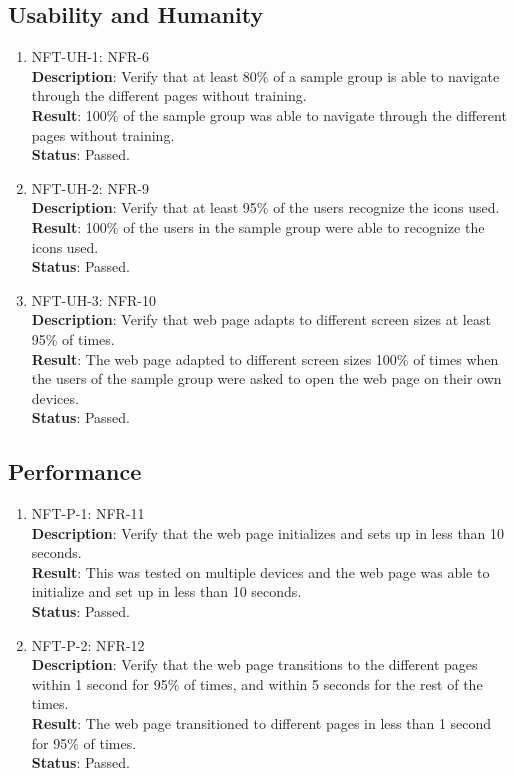 \documentclass[12pt, titlepage]{article}
\begin{document}
\subsection{Usability and Humanity}
\begin{enumerate}
    \item NFT-UH-1: NFR-6\\
    \textbf{Description}: Verify that at least 80\% of a sample group is able to navigate through the different pages without training.\\
    \textbf{Result}: 100\% of the sample group was able to navigate through the different pages without training.\\
    \textbf{Status}: Passed.\\
    
    \item NFT-UH-2: NFR-9\\
    \textbf{Description}: Verify that at least 95\% of the users recognize the icons used.\\
    \textbf{Result}: 100\% of the users in the sample group were able to recognize the icons used.\\
    \textbf{Status}: Passed.\\
    
    \item NFT-UH-3: NFR-10\\
    \textbf{Description}: Verify that web page adapts to different screen sizes at least 95\% of times.\\
    \textbf{Result}: The web page adapted to different screen sizes 100\% of times when the users of the sample group were asked to open the web page on their own devices.\\
    \textbf{Status}: Passed.\\
\end{enumerate}

\subsection{Performance}
\begin{enumerate}
    \item NFT-P-1: NFR-11\\
    \textbf{Description}: Verify that the web page initializes and sets up in less than 10 seconds.\\
    \textbf{Result}: This was tested on multiple devices and the web page was able to initialize and set up in less than 10 seconds.\\
    \textbf{Status}: Passed.\\
    
    \item NFT-P-2: NFR-12\\
    \textbf{Description}: Verify that the web page transitions to the different pages within 1 second for 95\% of times, and within 5 seconds for the rest of the times.\\
    \textbf{Result}: The web page transitioned to different pages in less than 1 second for 95\% of times.\\
    \textbf{Status}: Passed.\\
\end{enumerate}
	
\end{document}
